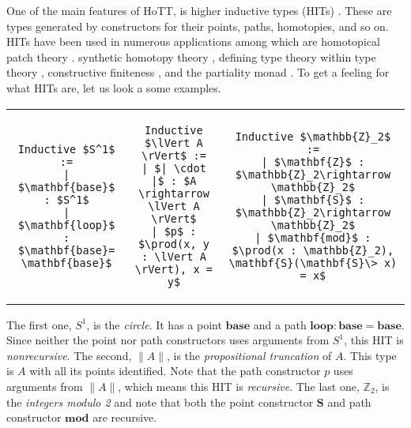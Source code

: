 \documentclass[9pt]{entcs}
\newcommand{\constructor}[1]{\mathbf{#1}}
\newcommand{\deprod}[3]{\prod(#1 : #2), #3} %
\newcommand{\0}{\textbf{0}} %
\newcommand{\1}{\textbf{1}} %
\newcommand{\trunct}[1]{\lVert #1 \rVert} %
\newcommand{\truncel}[1]{| #1 |} %
\newcommand{\Circ}{S^1} %
\newcommand{\base}{\constructor{base}} %
\newcommand{\loopS}{\constructor{loop}} %
\newcommand{\modZ}{\mathbb{Z}_2} %
\newcommand{\ZZ}{\constructor{Z}} %
\newcommand{\SZ}{\constructor{S}} %
\newcommand{\modP}{\constructor{mod}} %
\begin{document}
One of the main features of HoTT, is higher inductive types (HITs) \cite{hottbook}.
These are types generated by constructors for their points, paths, homotopies, and so on.
HITs have been used in numerous applications among which are homotopical patch theory \cite{AngiuliMLH16}. synthetic homotopy theory \cite{LicataF14,LicataS13,hottbook}, defining type theory within type theory \cite{AltenkirchK16}, constructive finiteness \cite{FruminGGW18}, and the partiality monad \cite{AltenkirchDK17}.
To get a feeling for what HITs are, let us look a some examples.

\lstset{language=Coq}
\setlength{\tabcolsep}{30pt}	
\begin{tabular}{ c c c }

\begin{lstlisting}[mathescape=true]
Inductive $\Circ$ :=
| $\base$ : $\Circ$
| $\loopS$ : $\base = \base$
\end{lstlisting}
&
\begin{lstlisting}[mathescape=true]
Inductive $\trunct{A}$ :=
| $\truncel{\cdot}$ : $A \rightarrow \trunct{A}$
| $p$ : $\deprod{x, y}{\trunct{A}}{x = y}$
\end{lstlisting}
&
\begin{lstlisting}[mathescape=true]
Inductive $\modZ$ :=
| $\ZZ$ : $\modZ \rightarrow \modZ$
| $\SZ$ : $\modZ \rightarrow \modZ$
| $\modP$ : $\deprod{x}{\modZ}{\SZ(\SZ \> x) = x}$
\end{lstlisting}
\end{tabular}

The first one, $\Circ$, is the \emph{circle}.
It has a point $\base$ and a path $\loopS : \base = \base$.
Since neither the point nor path constructors uses arguments from $\Circ$, this HIT is \emph{nonrecursive}.
The second, $\trunct{A}$, is the \emph{propositional truncation} of $A$.
This type is $A$ with all its points identified.
Note that the path constructor $p$ uses arguments from $\trunct{A}$, which means this HIT is \emph{recursive}.
The last one, $\modZ$, is the \emph{integers modulo 2} and note that both the point constructor $\SZ$ and path constructor $\modP$ are recursive.
\end{document}
